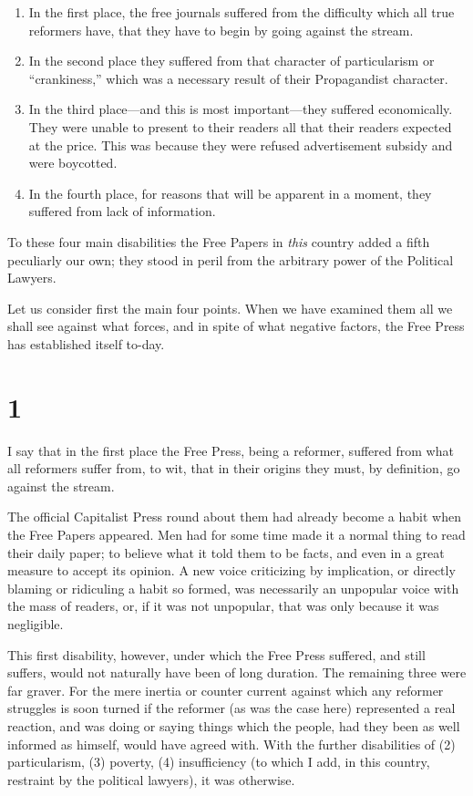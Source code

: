 \documentclass{book}
\begin{document}
\begin{enumerate}
	\item In the first place, the free journals suffered from the difficulty which all true reformers have, that they have to begin by going against the stream.


	\item In the second place they suffered from that character of particularism or “crankiness,” which was a necessary result of their Propagandist character.


	\item In the third place—and this is most important—they suffered economically. They were unable to present to their readers all that their readers expected at the price. This was because they were refused advertisement subsidy and were boycotted.


	\item In the fourth place, for reasons that will be apparent in a moment, they suffered from lack of information.



\end{enumerate}
To these four main disabilities the Free Papers in \emph{this} country added a fifth peculiarly our own; they stood in peril from the arbitrary power of the Political Lawyers.

Let us consider first the main four points. When we have examined them all we shall see against what forces, and in spite of what negative factors, the Free Press has established itself to-day.

\section*{1}
I say that in the first place the Free Press, being a reformer, suffered from what all reformers suffer from, to wit, that in their origins they must, by definition, go against the stream.

The official Capitalist Press round about them had already become a habit when the Free Papers appeared. Men had for some time made it a normal thing to read their daily paper; to believe what it told them to be facts, and even in a great measure to accept its opinion. A new voice criticizing by implication, or directly blaming or ridiculing a habit so formed, was necessarily an unpopular voice with the mass of readers, or, if it was not unpopular, that was only because it was negligible.

This first disability, however, under which the Free Press suffered, and still suffers, would not naturally have been of long duration. The remaining three were far graver. For the mere inertia or counter current against which any reformer struggles is soon turned if the reformer (as was the case here) represented a real reaction, and was doing or saying things which the people, had they been as well informed as himself, would have agreed with. With the further disabilities of (2) particularism, (3) poverty, (4) insufficiency (to which I add, in this country, restraint by the political lawyers), it was otherwise.
\end{document}
